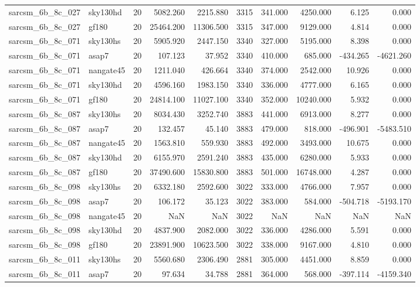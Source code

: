 \begin{tabular}{llrrrrrrrr}
sarcsm\_6b\_8c\_027 & sky130hd & 20 & 5082.260 & 2215.880 & 3315 & 341.000 & 4250.000 & 6.125 & 0.000 \\
sarcsm\_6b\_8c\_027 & gf180 & 20 & 25464.200 & 11306.500 & 3315 & 347.000 & 9129.000 & 4.814 & 0.000 \\
sarcsm\_6b\_8c\_071 & sky130hs & 20 & 5905.920 & 2447.150 & 3340 & 327.000 & 5195.000 & 8.398 & 0.000 \\
sarcsm\_6b\_8c\_071 & asap7 & 20 & 107.123 & 37.952 & 3340 & 410.000 & 685.000 & -434.265 & -4621.260 \\
sarcsm\_6b\_8c\_071 & nangate45 & 20 & 1211.040 & 426.664 & 3340 & 374.000 & 2542.000 & 10.926 & 0.000 \\
sarcsm\_6b\_8c\_071 & sky130hd & 20 & 4596.160 & 1983.150 & 3340 & 336.000 & 4777.000 & 6.165 & 0.000 \\
sarcsm\_6b\_8c\_071 & gf180 & 20 & 24814.100 & 11027.100 & 3340 & 352.000 & 10240.000 & 5.932 & 0.000 \\
sarcsm\_6b\_8c\_087 & sky130hs & 20 & 8034.430 & 3252.740 & 3883 & 441.000 & 6913.000 & 8.277 & 0.000 \\
sarcsm\_6b\_8c\_087 & asap7 & 20 & 132.457 & 45.140 & 3883 & 479.000 & 818.000 & -496.901 & -5483.510 \\
sarcsm\_6b\_8c\_087 & nangate45 & 20 & 1563.810 & 559.930 & 3883 & 492.000 & 3493.000 & 10.675 & 0.000 \\
sarcsm\_6b\_8c\_087 & sky130hd & 20 & 6155.970 & 2591.240 & 3883 & 435.000 & 6280.000 & 5.933 & 0.000 \\
sarcsm\_6b\_8c\_087 & gf180 & 20 & 37490.600 & 15830.800 & 3883 & 501.000 & 16748.000 & 4.287 & 0.000 \\
sarcsm\_6b\_8c\_098 & sky130hs & 20 & 6332.180 & 2592.600 & 3022 & 333.000 & 4766.000 & 7.957 & 0.000 \\
sarcsm\_6b\_8c\_098 & asap7 & 20 & 106.172 & 35.123 & 3022 & 383.000 & 584.000 & -504.718 & -5193.170 \\
sarcsm\_6b\_8c\_098 & nangate45 & 20 & NaN & NaN & 3022 & NaN & NaN & NaN & NaN \\
sarcsm\_6b\_8c\_098 & sky130hd & 20 & 4837.900 & 2082.000 & 3022 & 336.000 & 4286.000 & 5.591 & 0.000 \\
sarcsm\_6b\_8c\_098 & gf180 & 20 & 23891.900 & 10623.500 & 3022 & 338.000 & 9167.000 & 4.810 & 0.000 \\
sarcsm\_6b\_8c\_011 & sky130hs & 20 & 5560.680 & 2306.490 & 2881 & 305.000 & 4451.000 & 8.859 & 0.000 \\
sarcsm\_6b\_8c\_011 & asap7 & 20 & 97.634 & 34.788 & 2881 & 364.000 & 568.000 & -397.114 & -4159.340 \\

\end{tabular}
